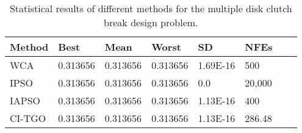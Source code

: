 
\begin{table*}[tp]
    \tiny
    \begin{center}
    
    \begin{tabular}{ P{2.0cm} P{2.0cm} P{2.0cm} P{2.0cm} P{2.0cm} P{2.0cm} P{2.0cm} P{2.0cm}  }
    \hline
    \textbf{Method} & \textbf{Best} & \textbf{Mean} & \textbf{Worst} & \textbf{SD} & \textbf{NFEs} \\
    \hline

    WCA & 0.313656 & 0.313656 & 0.313656 & 1.69E-16 & 500 \\
    IPSO & 0.313656 & 0.313656 & 0.313656 & 0.0 & 20,000 \\
    IAPSO & 0.313656 & 0.313656 & 0.313656 & 1.13E-16 & 400 \\
    CI-TGO & 0.313656 & 0.313656 & 0.313656 & 1.13E-16 & 286.48 \\

    \hline
    \end{tabular}
    \end{center}
    
    \caption{ Statistical results of different methods for the multiple disk clutch break design problem. \\[1em]}
    \label{tab:MD}
    \end{table*}
    
    